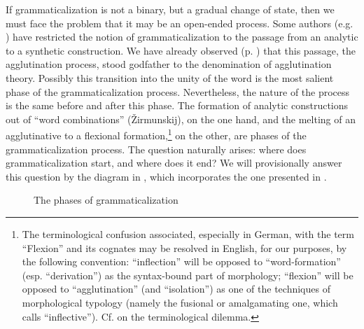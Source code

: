 If grammaticalization is not a binary, but a gradual change of state, then we must face the problem that it may be an open-ended process. Some authors (e.g. \citet[113--115]{Ronneberger-Sibold1980}) have restricted the notion of grammaticalization to the passage from an analytic to a synthetic construction. We have already observed (p. \pageref{Agglutinationstheorie}) that this passage, the agglutination process, stood godfather to the denomination of agglutination theory. Possibly this transition into the unity of the word is the most salient phase of the grammaticalization process. Nevertheless, the nature of the process is the same before and after this phase. The formation of analytic constructions out of ``word combinations'' (Žirmunskij), on the one hand, and the melting  of an agglutinative to a flexional formation,\footnote{The terminological confusion associated, especially in German, with the term ``Flexion'' and its cognates may be resolved in English, for our purposes, by the following convention: ``inflection'' will be opposed to ``word-formation'' (esp. ``derivation'') as the syntax-bound part of morphology; ``flexion'' will be opposed to ``agglutination'' (and ``isolation'') as one of the techniques of morphological typology (namely the fusional or amalgamating one, which \citet[129ff]{Sapir1921} calls ``inflective''). Cf. \citet[41f]{Comrie1981b} on the terminological dilemma.} on the other, are phases of the grammaticalization process. The question naturally arises: where does grammaticalization start, and where does it end? We will provisionally answer this question by the diagram in , which incorporates the one presented in \citet[209]{Givón1979b}.


\begin{figure}
\caption{The phases of grammaticalization} \label{fig:phases}
\end{figure}


